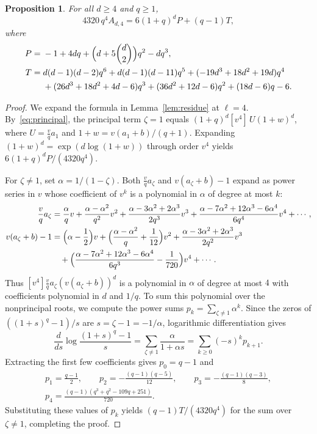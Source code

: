\documentclass[11pt]{amsart}
\newtheorem{proposition}[theorem]{Proposition}
\theoremstyle{remark}
\begin{document}
\begin{proposition}\label{prop:codim4}
For all $d\ge4$ and $q\ge1$,
\begin{equation}\label{eq:codim4}
 4320\,q^4A_{d,4}=6(1+q)^dP+(q-1)T,
\end{equation}
where
\begin{align*}
P={}&-1+4dq+\Bigl(d+5\binom d2\Bigr)q^2-dq^3,\\
T={}&d(d-1)(d-2)q^6+d(d-1)(d-11)q^5+(-19d^3+18d^2+19d)q^4\\
 &+(26d^3+18d^2+4d-6)q^3+(36d^2+12d-6)q^2+(18d-6)q-6.
\end{align*}
\end{proposition}

\begin{proof}
We expand the formula in Lemma~\ref{lem:residue} at $\ell=4$. By~\eqref{eq:principal},
the principal term $\zeta=1$ equals $(1+q)^d[v^4]\,U(1+w)^d$, where
$U=\frac vqa_1$ and $1+w=v(a_1+b)/(q+1)$. Expanding
$(1+w)^d=\exp(d\log(1+w))$ through order $v^4$ yields
$6(1+q)^dP/(4320q^4)$.

For $\zeta\ne1$, set $\alpha=1/(1-\zeta)$. Both $\frac vqa_\zeta$ and
$v(a_\zeta+b)-1$ expand as power series in $v$ whose coefficient of $v^k$ is a
polynomial in $\alpha$ of degree at most $k$:
\begin{align*}
 \frac vqa_\zeta&=\frac{\alpha}{q}v+\frac{\alpha-\alpha^2}{q^2}v^2
 +\frac{\alpha-3\alpha^2+2\alpha^3}{2q^3}v^3
 +\frac{\alpha-7\alpha^2+12\alpha^3-6\alpha^4}{6q^4}v^4+\cdots,\\
 v(a_\zeta+b)-1&=\Bigl(\alpha-\frac12\Bigr)v+\Bigl(\frac{\alpha-\alpha^2}{q}+\frac1{12}\Bigr)v^2
 +\frac{\alpha-3\alpha^2+2\alpha^3}{2q^2}v^3\\
 &\quad+\Bigl(\frac{\alpha-7\alpha^2+12\alpha^3-6\alpha^4}{6q^3}-\frac1{720}\Bigr)v^4+\cdots.
\end{align*}
Thus $[v^4]\frac vqa_\zeta(v(a_\zeta+b))^d$ is a polynomial in $\alpha$ of
degree at most $4$ with coefficients polynomial in $d$ and $1/q$. To sum this
polynomial over the nonprincipal roots, we compute the power sums
$p_k=\sum_{\zeta\ne1}\alpha^k$. Since the zeros of $((1+s)^q-1)/s$ are
$s=\zeta-1=-1/\alpha$, logarithmic differentiation gives
\[
 \frac{d}{ds}\log\frac{(1+s)^q-1}{s}=\sum_{\zeta\ne1}\frac{\alpha}{1+\alpha s}
 =\sum_{k\ge0}(-s)^kp_{k+1}.
\]
Extracting the first few coefficients gives $p_0=q-1$ and
\begin{gather*}
 p_1=\frac{q-1}2,\qquad p_2=-\frac{(q-1)(q-5)}{12},\qquad p_3=-\frac{(q-1)(q-3)}8,\\
 p_4=\frac{(q-1)(q^3+q^2-109q+251)}{720}.
\end{gather*}
Substituting these values of $p_k$ yields $(q-1)T/(4320q^4)$ for the sum over
$\zeta\ne1$, completing the proof.
\end{proof}
\end{document}
